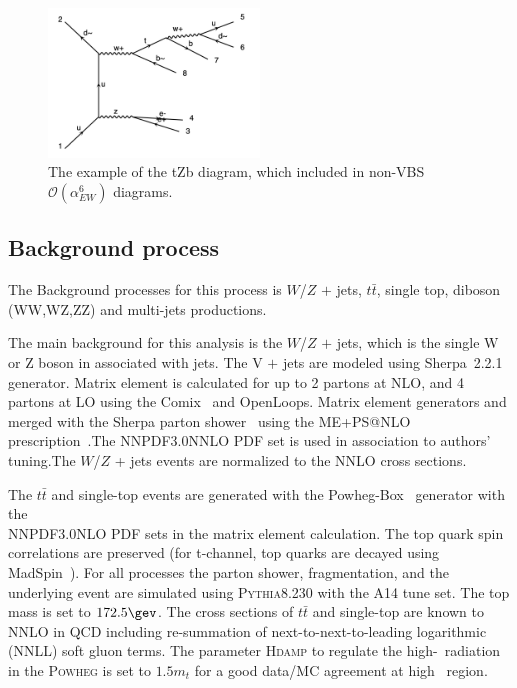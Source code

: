 \begin{figure}[tbp]
\begin{center}
\includegraphics[width=0.5\textwidth,keepaspectratio]{figures/samples/feynEWKnonVBStZb.pdf}
\caption{
The example of the tZb diagram, which included in non-VBS $\mathcal{O}(\alpha_{EW}^6)$ diagrams.
}
\label{fig:feynmantZb}
\end{center}
\end{figure}

\subsection{Background process}

The Background processes for this process is  $W$/$Z$ $\plus$ jets, $t\bar{t}$, single top, diboson (WW,WZ,ZZ) and multi-jets productions. 

The main background for this analysis is the  $W$/$Z$ $\plus$ jets, which is the single W or Z boson in associated with jets. The V $\plus$ jets are modeled using Sherpa~2.2.1~\cite{Gleisberg:2008ta} generator. Matrix element is calculated for up to 2 partons at NLO, and 4 partons at LO using the Comix~\cite{Gleisberg:2008fv} and OpenLoops\cite{Cascioli:2011va}. Matrix element generators and merged with the Sherpa parton shower~\cite{Schumann:2007mg} using the ME+PS@NLO prescription~\cite{Hoeche:2012yf}.The NNPDF3.0NNLO PDF set is used in association to authors' tuning.The $W$/$Z$ + jets events are normalized to the NNLO cross sections.

The $t\bar{t}$ and single-top events are generated with the Powheg-Box~\cite{Alioli:2010xd} generator with the \\
NNPDF3.0NLO PDF\cite{Ball:2014uwa} sets in the matrix element calculation.
The top quark spin correlations are preserved (for t-channel, top quarks are decayed using MadSpin~\cite{Artoisenet:2012st}).
For all processes the parton shower, fragmentation, and the underlying event are simulated using \textsc{Pythia}8.230 with the A14 tune set\cite{ATL-PHYS-PUB-2014-021}.
The top mass is set to $172.5\gev$.
The cross sections of $t\bar{t}$ and single-top are known to NNLO in QCD including re-summation of next-to-next-to-leading logarithmic (NNLL) soft gluon terms\cite{Czakon:2011xx,Kidonakis:2011wy,Kidonakis:2010tc,Kidonakis:2010ux}.
The parameter \textsc{Hdamp} to regulate the high-\pt\ radiation in the \textsc{Powheg} is set to $1.5m_{t}$ for a good data/MC agreement at high \pt\ region\cite{ATL-PHYS-PUB-2016-020}.

